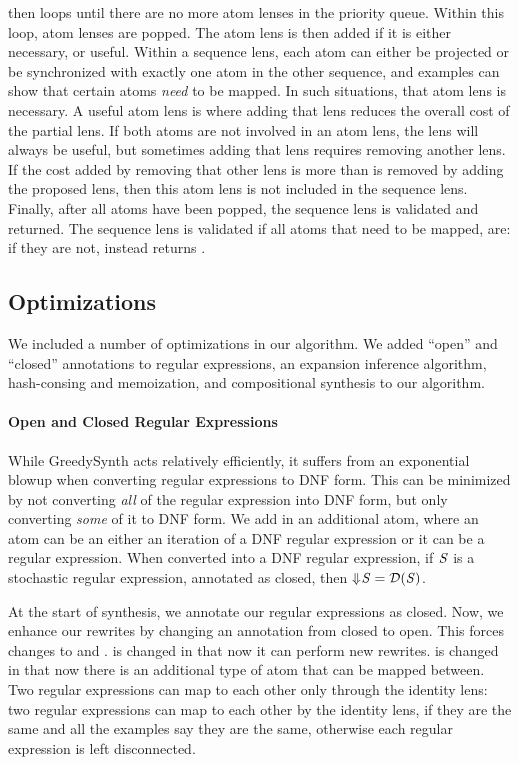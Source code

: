 \documentclass[acmsmall,screen,anonymous]{acmart}
\begin{document}
\GreedySeqSynth then loops until there are no more atom lenses in the priority
queue. Within this loop, atom lenses are popped. The atom lens is then added if
it is either necessary, or useful. Within a sequence lens, each atom can either
be projected or be synchronized with exactly one atom in the other sequence, and
examples can show that certain atoms \emph{need} to be mapped. In such
situations, that atom lens is necessary. A useful atom lens is where adding that
lens reduces the overall cost of the partial lens. If both atoms are not
involved in an atom lens, the lens will always be useful, but sometimes adding
that lens requires removing another lens. If the cost added by removing that
other lens is more than is removed by adding the proposed lens, then this atom
lens is not included in the sequence lens. Finally, after all atoms have been
popped, the sequence lens is validated and returned. The sequence lens is
validated if all atoms that need to be mapped, are: if they are not,
 instead returns \None.

\subsection{Optimizations}

We included a number of optimizations in our algorithm. We added ``open'' and
``closed'' annotations to regular expressions, an expansion inference algorithm,
hash-consing and memoization, and compositional synthesis to our algorithm.

\paragraph*{Open and Closed Regular Expressions} While GreedySynth acts
relatively efficiently, it suffers from an exponential blowup when converting
regular expressions to DNF form. This can be minimized by not converting
\emph{all} of the regular expression into DNF form, but only converting
\emph{some} of it to DNF form. We add in an additional atom, where an atom can
be an either an iteration of a DNF regular expression or it can be a regular
expression. When converted into a DNF regular expression, if $\mathit{S}$ is a
stochastic regular expression, annotated as closed, then $\Downarrow\mkern-4mu \mathit{S}
= \mathcal{D}(\mathit{S})$.

At the start of synthesis, we annotate our regular expressions as closed. Now,
we enhance our rewrites by changing an annotation from closed to open. This
forces changes to \RXSearch and \GreedySynth.  \RXSearch is changed in that now
it can perform new rewrites.  \GreedySynth is changed in that now there is an
additional type of atom that can be mapped between.  Two regular expressions can
map to each other only through the identity lens: two regular expressions can
map to each other by the identity lens, if they are the same and all the
examples say they are the same, otherwise each regular expression is left
disconnected.
\end{document}

